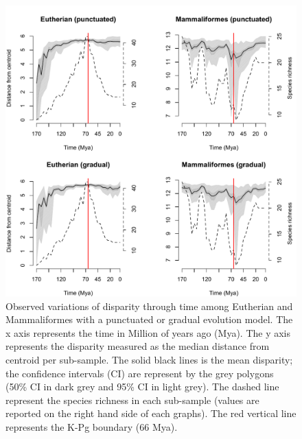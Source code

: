 \documentclass[12pt,letterpaper]{article}
\begin{document}
\begin{figure}[!htbp]
\centering
    \includegraphics[keepaspectratio=true]{Figures/Main_results.pdf}
\caption{Observed variations of disparity through time among Eutherian and Mammaliformes with a punctuated or gradual evolution model. The x axis represents the time in Million of years ago (Mya). The y axis represents the disparity measured as the median distance from centroid per sub-sample. The solid black lines is the mean disparity; the confidence intervals (CI) are represent by the grey polygons (50\% CI in dark grey and 95\% CI in light grey). The dashed line represent the species richness in each sub-sample (values are reported on the right hand side of each graphs). The red vertical line represents the K-Pg boundary (66 Mya).}
\label{fig:Fig_Raw_results}
\end{figure}
\end{document}
